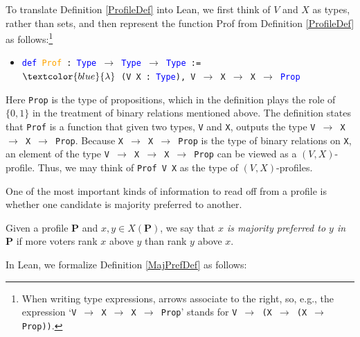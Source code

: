 \documentclass[runningheads]{llncs}
\begin{document}
To translate Definition \ref{ProfileDef} into Lean, we first think of $V$ and $X$ as types, rather than sets, and then represent the function \textsf{Prof} from Definition \ref{ProfileDef} as follows:\footnote{When writing type expressions, arrows associate to the right, so, e.g., the expression  `\texttt{V $\to$ X $\to$ X $\to$ Prop}' stands for \texttt{V $\to$ (X $\to$ (X $\to$ Prop))}.}
\begin{itemize}
\item[] \texttt{\textcolor{blue}{def} \textcolor{orange}{Prof} : \textcolor{blue}{Type} $\to$ \textcolor{blue}{Type} $\to$ \textcolor{blue}{Type} := }\\\texttt{$\textcolor{blue}{\lambda}$ (V X : \textcolor{blue}{Type}), V $\to$ X $\to$ X $\to$ \textcolor{blue}{Prop}}
\end{itemize}
Here \texttt{Prop} is the type of propositions, which in the definition plays the role of $\{0,1\}$ in the treatment of binary relations mentioned above.  The definition states that \texttt{Prof} is a function that given two types, \texttt{V} and \texttt{X}, outputs the type \texttt{V $\to$ X $\to$ X $\to$ Prop}. Because \texttt{X $\to$ X $\to$ Prop} is the type of binary relations on \texttt{X}, an element of the type \texttt{V $\to$ X $\to$ X $\to$ Prop} can be viewed as a $(V,X)$-profile. Thus, we may think of \texttt{Prof V X} as the type of $(V,X)$-profiles.

One of the most important kinds of information to read off from a profile is whether one candidate is majority preferred to another.

\begin{definition}\label{MajPrefDef} \textnormal{Given a profile $\mathbf{P}$ and $x,y\in X(\mathbf{P})$, we say that \textit{$x$ is majority preferred to $y$ in $\mathbf{P}$} if more voters rank $x$ above $y$ than rank $y$ above $x$.}\end{definition}

In Lean, we formalize Definition \ref{MajPrefDef} as follows:
\end{document}
